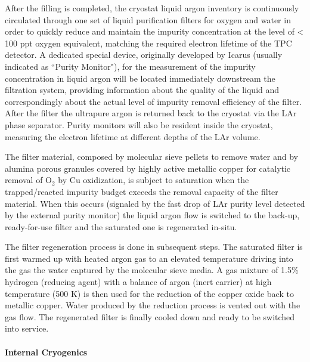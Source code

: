 After the filling is completed, the cryostat liquid argon inventory is continuously circulated through one set of liquid purification filters 
for oxygen and water in order to quickly reduce and maintain the impurity concentration at the 
 level of < 100 ppt oxygen equivalent, matching the required electron lifetime of the TPC detector. 
A dedicated special device, originally developed by Icarus (usually indicated as ``Purity Monitor"), 
for the measurement of the impurity concentration in liquid argon will be located immediately downstream the filtration system, 
providing information about the quality of the liquid and correspondingly about the actual level of impurity removal efficiency of the filter. 
After the filter the ultrapure argon is returned back to the cryostat via the LAr phase separator. 
Purity monitors will also be resident inside the cryostat, measuring the electron lifetime at different depths of the LAr volume. 

The filter material, composed by molecular sieve pellets to remove water and by alumina porous granules covered by highly active metallic copper for catalytic removal of O$_2$ by Cu oxidization, is subject to saturation when the trapped/reacted impurity budget exceeds the removal capacity of the filter material. When this occurs (signaled by the 
fast drop of LAr purity level detected by the external purity monitor) the liquid argon flow is switched to the back-up, ready-for-use filter and the saturated one is regenerated in-situ.

The filter regeneration process is done in subsequent steps. The saturated filter is first warmed up with heated argon gas to an elevated temperature driving into the gas the water captured by the molecular sieve media. A gas mixture of 1.5\% hydrogen (reducing agent) with a balance of argon (inert carrier) at high temperature (500 K) is then used for the reduction of the copper oxide back to metallic copper. Water produced by the reduction process is vented out with the gas flow.
The regenerated filter is finally cooled down and ready to be switched into service. 

\paragraph{Internal Cryogenics}


